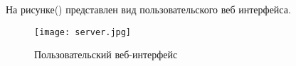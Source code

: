 На рисунке() представлен вид пользовательского веб интерфейса.
\begin{figure}[ht]
    \centering
    \texttt{[image: server.jpg]}
    \caption{Пользовательский веб-интерфейс}
    \label{fig:mpr}
\end{figure}
